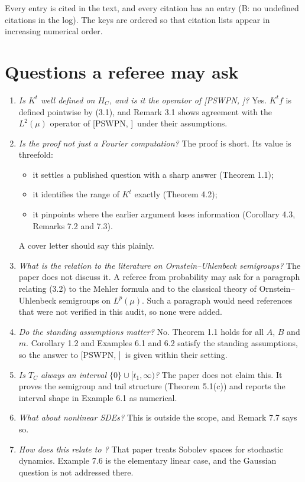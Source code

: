 \documentclass[11pt]{amsart}
\newcommand{\tB}{\textsf{B}}
\newcommand{\PS}[1][]{[PSWPN\ifx\relax#1\relax\else, #1\fi]}
\begin{document}
Every entry is cited in the text, and every citation has an entry (\tB: no undefined citations in the log). The keys
are ordered so that citation lists appear in increasing numerical order.

\section{Questions a referee may ask}\label{sec:referee}

\begin{enumerate}
\item \emph{Is $K^t$ well defined on $H_C$, and is it the operator of \PS?} Yes. $K^tf$ is defined pointwise by (3.1),
and Remark 3.1 shows agreement with the $L^2(\mu)$ operator of \PS\ under their assumptions.
\item \emph{Is the proof not just a Fourier computation?} The proof is short. Its value is threefold:
\begin{itemize}
\item it settles a published question with a sharp answer (Theorem 1.1);
\item it identifies the range of $K^t$ exactly (Theorem 4.2);
\item it pinpoints where the earlier argument loses information (Corollary 4.3, Remarks 7.2 and 7.3).
\end{itemize}
A cover letter should say this plainly.
\item \emph{What is the relation to the literature on Ornstein--Uhlenbeck semigroups?} The paper does not discuss it.
A referee from probability may ask for a paragraph relating (3.2) to the Mehler formula and to the classical theory of
Ornstein--Uhlenbeck semigroups on $L^p(\mu)$. Such a paragraph would need references that were not verified in this
audit, so none were added.
\item \emph{Do the standing assumptions matter?} No. Theorem 1.1 holds for all $A$, $B$ and $m$. Corollary 1.2 and
Examples 6.1 and 6.2 satisfy the standing assumptions, so the answer to \PS\ is given within their setting.
\item \emph{Is $T_C$ always an interval $\{0\}\cup[t_1,\infty)$?} The paper does not claim this. It proves the
semigroup and tail structure (Theorem 5.1(c)) and reports the interval shape in Example 6.1 as numerical.
\item \emph{What about nonlinear SDEs?} This is outside the scope, and Remark 7.7 says so.
\item \emph{How does this relate to \cite{Hertel}?} That paper treats Sobolev spaces for stochastic dynamics. Example
7.6 is the elementary linear case, and the Gaussian question is not addressed there.
\end{enumerate}
\end{document}
